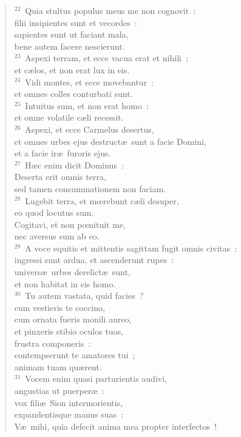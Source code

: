 \begin{verse}
${}^{22}$~Quia stultus populus meus me non cognovit~:\\ filii insipientes sunt et vecordes~:\\ sapientes sunt ut faciant mala,\\ bene autem facere nescierunt.\\
${}^{23}$~Aspexi terram, et ecce vacua erat et nihili~;\\ et c\ae los, et non erat lux in eis.\\
${}^{24}$~Vidi montes, et ecce movebantur~:\\ et omnes colles conturbati sunt.\\
${}^{25}$~Intuitus sum, et non erat homo~:\\ et omne volatile c\ae li recessit.\\
${}^{26}$~Aspexi, et ecce Carmelus desertus,\\ et omnes urbes ejus destruct\ae\ sunt a facie Domini,\\ et a facie ir\ae\ furoris ejus.\\
${}^{27}$~H\ae c enim dicit Dominus~:\\ Deserta erit omnis terra,\\ sed tamen consummationem non faciam.\\
${}^{28}$~Lugebit terra, et mœrebunt c\ae li desuper,\\ eo quod locutus sum.\\ Cogitavi, et non pœnituit me,\\ nec aversus sum ab eo.\\
${}^{29}$~A voce equitis et mittentis sagittam fugit omnis civitas~:\\ ingressi sunt ardua, et ascenderunt rupes~:\\ univers\ae\ urbes derelict\ae\ sunt,\\ et non habitat in eis homo.\\
${}^{30}$~Tu autem vastata, quid facies~?\\ cum vestieris te coccino,\\ cum ornata fueris monili aureo,\\ et pinxeris stibio oculos tuos,\\ frustra componeris~:\\ contempserunt te amatores tui~;\\ animam tuam qu\ae rent.\\
${}^{31}$~Vocem enim quasi parturientis audivi,\\ angustias ut puerper\ae~:\\ vox fili\ae\ Sion intermorientis,\\ expandentisque manus suas~:\\ V\ae\ mihi, quia defecit anima mea propter interfectos~!\end{verse}


